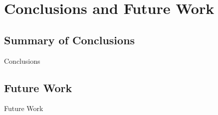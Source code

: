 \glsresetall %
\chapter{Conclusions and Future Work}\label{ch:Conclusion}

\section{Summary of Conclusions}
Conclusions

\section{Future Work}\label{sec:FutureWork}
Future Work
